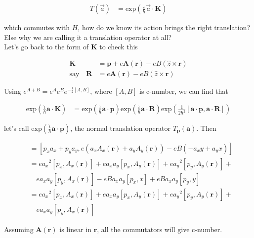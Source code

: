 \documentclass[11pt,a4paper,notitlepage]{article}
\newcommand{\bsym}{\boldsymbol}
\newcommand{\non}{\nonumber}
\newcommand{\nexp}[1]{\text{exp}\left( #1 \right)}
\newcommand{\niota}{\dot{\iota}}
\newcommand{\cbrak}[1]{\left( #1 \right)}
\begin{document}
		\begin{align}
    			T(\vec{a}) &= \text{exp}\left( \frac{\iota}{\hbar}{\vec{a}\cdot\bsym{K}}\right)
    		\end{align}
		 
		which commutes with $H$, how do we know its action brings the right translation? Else why we are calling 
		it a translation operator at all?\\

		Let's go back to the form of $\bsym{K}$ to check this
		
		\begin{align*}
    			\bsym{K} &= \bsym{p} + e\bsym{A}(\bsym{r}) - eB(\hat{z} \times \bsym{r}) \\
    			\text{say}\quad \bsym{R} &= e\bsym{A}(\bsym{r}) - eB(\hat{z} \times \bsym{r})
    		\end{align*}
		
		Using $e^{A+B} = e^{A}e^{B}e^{-\frac{1}{2}[A,B]}$, where $[A,B]$ is c-number, we can find that
		
		\begin{align}
    			\nexp{\frac{\niota}{\hbar}\bsym{a} \cdot \bsym{K}}  &=  \nexp{\frac{\niota}{\hbar}\bsym{a} \cdot \bsym{p}} \nexp{\frac{\niota}{\hbar}\bsym{a}\cdot\bsym{R}}\nexp{\frac{1}{2\hbar^{2}}[\bsym{a}\cdot\bsym{p},\bsym{a}\cdot\bsym{R}]}
    		\end{align}
		
		let's call $\nexp{\frac{\niota}{\hbar}\bsym{a} \cdot \bsym{p}}$, the normal translation operator $T_{\bsym{p}}\cbrak{\bsym{a}}$. Then

		\begin{align}
    			[\bsym{a}\cdot\bsym{p},\bsym{a}\cdot\bsym{R}] &= [p_{x}a_{x}+ p_{y}a_{y},e(a_{x}A_{x}(\bsym{r})+a_{y}A_{y}(\bsym{r}))-eB(-a_{x}y+a_{y}x)] \\
    			&= e{a_{x}}^{2}[p_{x},A_{x}(\bsym{r})] + e{a_{x}a_{y}}[p_{x},A_{y}(\bsym{r})] + e{a_{y}}^{2}[p_{y},A_{y}(\bsym{r})] + \non \\ 
    			&\quad e{a_{x}a_{y}}[p_{y},A_{x}(\bsym{r})]-eBa_{x}a_{y}[p_{x},x] + eBa_{x}a_{y}[p_{y},y] \non \\ 
    			&= e{a_{x}}^{2}[p_{x},A_{x}(\bsym{r})] + e{a_{x}a_{y}}[p_{x},A_{y}(\bsym{r})] + e
    			{a_{y}}^{2}[p_{y},A_{y}(\bsym{r})] + \non \\ 
    			&\quad e{a_{x}a_{y}}[p_{y},A_{x}(\bsym{r})] \non
    		\end{align}
    		
    		Assuming $\bsym{A}(\bsym{r})$ is linear in $\bsym{r}$, all the commutators will give c-number.  
    		
\end{document}
